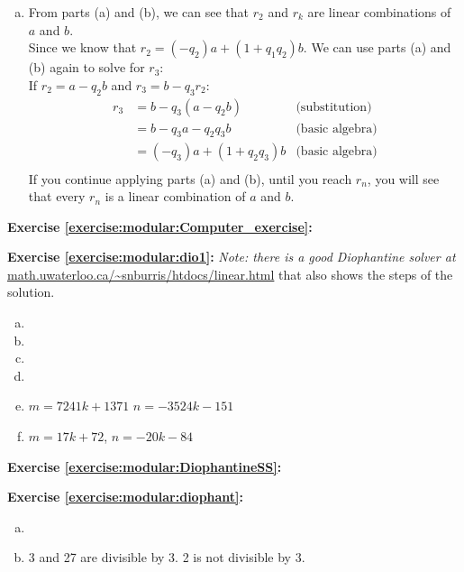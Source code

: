 \begin{enumerate}[(a)]
\item
From parts (a) and (b), we can see that $r_{2}$ and $r_{k}$ are linear combinations of $a$ and $b$.\\
Since we know that $r_{2} = (-q_{2})a + (1 + q_{1}q_{2})b$. We can use parts (a) and (b) again to solve for $r_{3}$:\\
If $r_{2} = a - q_{2}b$ and $r_{3} = b - q_{3}r_{2}$:
\begin{align*}
r_{3} &= b - q_{3}(a - q_{2}b) &\text{(substitution)}\\
&= b - q_{3}a - q_{2}q_{3}b &\text{(basic algebra)}\\
&= (-q_{3})a + (1 + q_{2}q_{3})b &\text{(basic algebra)}\\
\end{align*}
If you continue applying parts (a) and (b), until you reach $r_{n}$, you will see that every $r_{n}$ is a linear combination of $a$ and $b$.
\end{enumerate}

\noindent\textbf{Exercise \ref{exercise:modular:Computer_exercise}:}

\noindent\textbf{Exercise \ref{exercise:modular:dio1}:} 
\emph{Note: there is a good  Diophantine solver at} \url{math.uwaterloo.ca/~snburris/htdocs/linear.html} that also shows
the steps of the solution.
\begin{enumerate} [(a)]
\item
\item
\item
\item
\item
$m=7241k+1371$ $n=-3524k-151$
\item
$m=17k+72$, $n=-20k-84$
\end {enumerate}

\noindent\textbf{Exercise \ref{exercise:modular:DiophantineSS}:}

\noindent\textbf{Exercise \ref{exercise:modular:diophant}:}
\begin{enumerate} [(a)]
\item
\item
3 and 27 are divisible by 3. 2 is not divisible by 3.
\end {enumerate}

